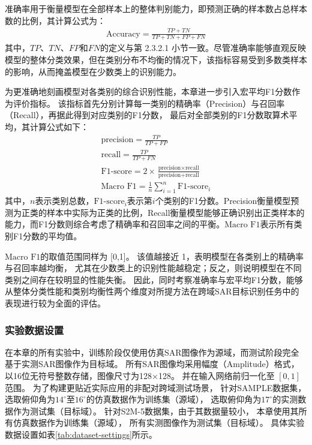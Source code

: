 准确率用于衡量模型在全部样本上的整体判别能力，即预测正确的样本数占总样本数的比例，其计算公式为：
\begin{gather}
\text{Accuracy} = \frac{TP + TN}{TP + TN + FP + FN}
\end{gather}
其中，${TP}$、${TN}$、${FP}$和${FN}$的定义与第 2.3.2.1 小节一致。尽管准确率能够直观反映模型的整体分类效果，但在类别分布不均衡的情况下，该指标容易受到多数类样本的影响，从而掩盖模型在少数类上的识别能力。

为更准确地刻画模型对各类别的综合识别性能，本章进一步引入宏平均F1分数作为评价指标。
该指标首先分别计算每一类别的精确率（Precision）与召回率（Recall），再据此得到对应类别的F1分数，
最后对全部类别的F1分数取算术平均，其计算公式如下：
\begin{gather}
\text{precision} = \frac{TP}{TP + FP} \\
\text{recall} = \frac{TP}{TP + FN} \\
\text{F1-score} = 2 \times \frac{\text{precision} \times \text{recall}}{\text{precision} + \text{recall}} \\
\text{Macro F1} = \frac{1}{n} \sum_{i=1}^{n} \text{F1-score}_i
\end{gather}
其中，$n$表示类别总数，$\text{F1-score}_i$表示第$i$个类别的F1分数。Precision衡量模型预测为正类的样本中实际为正类的比例，Recall衡量模型能够正确识别出正类样本的能力，而F1分数则综合考虑了精确率和召回率之间的平衡。$\text{Macro F1}$表示所有类别F1分数的平均值。

$\text{Macro F1}$的取值范围同样为 [0,1]。
该值越接近 1，表明模型在各类别上的精确率与召回率越均衡，
尤其在少数类上的识别性能越稳定；反之，则说明模型在不同类别之间存在较明显的性能失衡。
因此，同时考察准确率与宏平均F1分数，能够从整体分类性能和类别均衡性两个维度对所提方法在跨域SAR目标识别任务中的表现进行较为全面的评估。


\subsubsection{实验数据设置}

在本章的所有实验中，训练阶段仅使用仿真SAR图像作为源域，而测试阶段完全基于实测SAR图像作为目标域。
所有SAR图像均采用幅度（Amplitude）格式，以16位无符号整数存储，图像尺寸为128×128。
并在输入网络前归一化至 $[0, 1]$ 范围。
为了构建更贴近实际应用的非配对跨域测试场景，
针对SAMPLE数据集，
选取俯仰角为$14^{\circ}$至$16^{\circ}$的仿真数据作为训练集（源域），
选取俯仰角为$17^{\circ}$的实测数据作为测试集（目标域）。
针对S2M-5数据集，由于其数据量较小，
本章使用其所有仿真数据作为训练集（源域），
所有实测图像作为测试集（目标域）。
具体实验数据设置如表\ref{tab:dataset-settings}所示。

